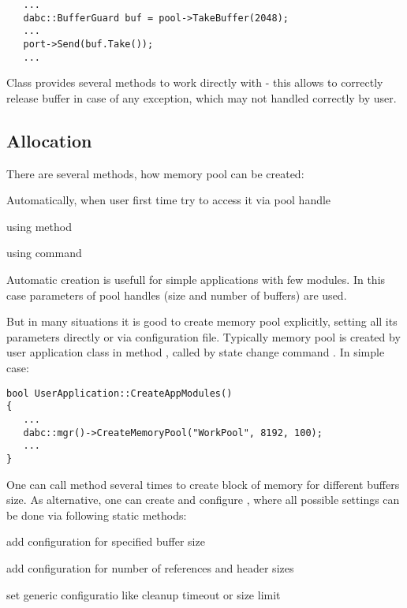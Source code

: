 \begin{small}
\begin{verbatim}     
   ...
   dabc::BufferGuard buf = pool->TakeBuffer(2048);
   ...
   port->Send(buf.Take());
   ...
\end{verbatim}     
\end{small}

Class  provides several methods to work directly 
with  - this allows to correctly release buffer
in case of any exception, which may not handled correctly by user.  


\subsection{Allocation}

There are several methods, how memory pool can be created:
\bbul
\item Automatically, when user first time try to access it via pool handle 
\item using  method
\item using  command
\ebul

Automatic creation is usefull for simple applications with few modules.
In this case parameters of pool handles (size and number of buffers) are used. 

But in many situations it is good to create memory pool explicitly,
setting all its parameters directly or via configuration file.
Typically memory pool is created by user application class in 
method , called by state change command .
In simple case:

\begin{small}
\begin{verbatim}     
bool UserApplication::CreateAppModules()
{
   ...
   dabc::mgr()->CreateMemoryPool("WorkPool", 8192, 100);
   ...
}
\end{verbatim}     
\end{small}

One can call  method several times to create 
block of memory for different buffers size. As alternative, one can create and 
configure , where all possible settings can be 
done via following static methods:
\bbul
\item[\func{AddMem()}] add configuration for specified buffer size 
\item[\func{AddRef()}] add configuration for number of references and header sizes 
\item[\func{AddCfg()}] set generic configuratio like cleanup timeout or size limit 
\ebul

